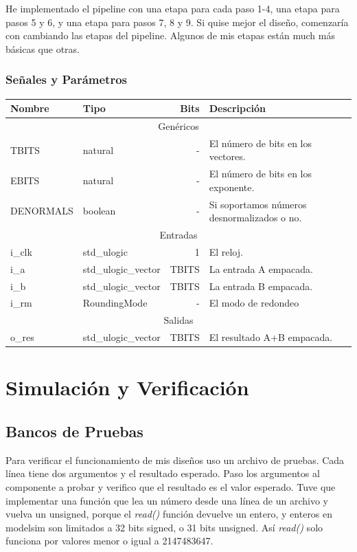 \documentclass[a4paper]{article}
\begin{document}
He implementado el pipeline con una etapa para cada paso 1-4, una etapa para pasos 5 y 6, y una etapa para pasos 7, 8 y 9. Si quise mejor el diseño, comenzaría con cambiando las etapas del pipeline. Algunos de mis etapas están much más básicas que otras.

\subsubsection{Señales y Parámetros}

\begin{tabular}{| l | l | r | l |}
\hline
\textbf{Nombre} & \textbf{Tipo} & \textbf{Bits} & \textbf{Descripción} \\ \hline
\multicolumn{4}{|c|}{Genéricos} \\ \hline
TBITS & natural & - & El número de bits en los vectores. \\
EBITS & natural & - & El número de bits en los exponente. \\
DENORMALS & boolean & - & Si soportamos números desnormalizados o no. \\ \hline
\multicolumn{4}{|c|}{Entradas} \\ \hline
i\_clk & std\_ulogic & 1 & El reloj. \\
i\_a & std\_ulogic\_vector & TBITS & La entrada A empacada. \\
i\_b & std\_ulogic\_vector & TBITS & La entrada B empacada. \\
i\_rm & RoundingMode & - & El modo de redondeo \\ \hline
\multicolumn{4}{|c|}{Salidas} \\ \hline
o\_res & std\_ulogic\_vector & TBITS & El resultado A+B empacada. \\ \hline
\end{tabular}

\section{Simulación y Verificación}

\subsection{Bancos de Pruebas}

Para verificar el funcionamiento de mis diseños uso un archivo de pruebas. Cada línea tiene dos argumentos y el resultado esperado. Paso los argumentos al componente a probar y verifico que el resultado es el valor esperado. Tuve que implementar una función que lea un número desde una línea de un archivo y vuelva un unsigned, porque el \textit{read()} función devuelve un entero, y enteros en modelsim son limitados a 32 bits signed, o 31 bits unsigned. Así \textit{read()} solo funciona por valores menor o igual a 2147483647.
\end{document}
